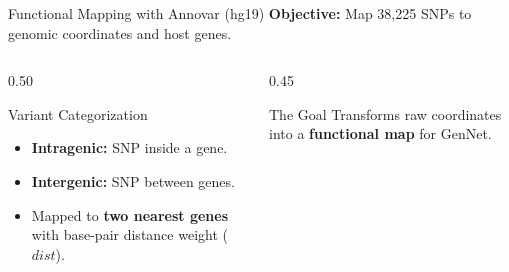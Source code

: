 \documentclass[aspectratio=169]{beamer}
\begin{document}
\begin{frame}{Functional Mapping with Annovar (hg19)}
    \textbf{Objective:} Map 38,225 SNPs to genomic coordinates and host genes.

    \begin{columns}[T]
        \begin{column}{0.50\textwidth}
            \begin{block}{Variant Categorization}
                \small
                \begin{itemize}
                    \item \textbf{Intragenic:} SNP inside a gene.
                    \item \textbf{Intergenic:} SNP between genes.
                    \item Mapped to \textbf{two nearest genes} with base-pair distance weight ($dist$).
                \end{itemize}
            \end{block}
        \end{column}
        \pause
        \begin{column}{0.45\textwidth}
            \begin{block}{The Goal}
                \small
                Transforms raw coordinates into a \textbf{functional map} for GenNet.
            \end{block}
        \end{column}
    \end{columns}

    \vspace{0.3cm}
    \pause
\end{frame}
\end{document}

